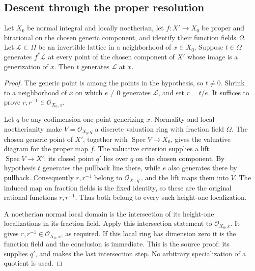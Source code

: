 \subsection{Descent through the proper resolution}

\begin{srlemma}
\label{lem:faithful-flat-proper-pushdown}
Let \(X_0\) be normal integral and locally noetherian,
let \(f:X'\to X_0\) be proper and birational on the chosen
generic component, and identify their function fields \(\Omega\).
Let \(\mathcal L\subset\Omega\) be an invertible lattice in a
neighborhood of \(x\in X_0\).
Suppose \(t\in\Omega\) generates \(f^*\mathcal L\) at every
point of the chosen component of \(X'\) whose image is a
generization of \(x\).
Then \(t\) generates \(\mathcal L\) at \(x\).
\end{srlemma}
\begin{proof}
The generic point is among the points in the hypothesis, so \(t\ne0\).
Shrink to a neighborhood of \(x\) on which \(e\ne0\) generates
\(\mathcal L\), and set \(r=t/e\).
It suffices to prove \(r,r^{-1}\in\mathcal O_{X_0,x}\).

Let \(q\) be any codimension-one point generizing \(x\).
Normality and local noetherianity make
\(V=\mathcal O_{X_0,q}\) a discrete valuation ring with fraction
field \(\Omega\).
The chosen generic point of \(X'\), together with
\(\operatorname{Spec}V\to X_0\), gives the valuative diagram
for the proper map \(f\).
The valuative criterion supplies a lift
\(\operatorname{Spec}V\to X'\); its closed point \(q'\) lies
over \(q\) on the chosen component.
By hypothesis \(t\) generates the pullback line there,
while \(e\) also generates there by pullback.
Consequently \(r,r^{-1}\) belong to
\(\mathcal O_{X',q'}\), and the lift maps them into \(V\).
The induced map on fraction fields is the fixed identity,
so these are the original rational functions \(r,r^{-1}\).
Thus both belong to every such height-one localization.

A noetherian normal local domain is the intersection of its
height-one localizations in its fraction field.
Apply this intersection statement to
\(\mathcal O_{X_0,x}\).
It gives \(r,r^{-1}\in\mathcal O_{X_0,x}\), as required.
If this local ring has dimension zero it is the function
field and the conclusion is immediate.
This is the source proof: its  supplies
\(q'\), and 
makes the last intersection step.
No arbitrary specialization of a quotient is used.
\end{proof}

